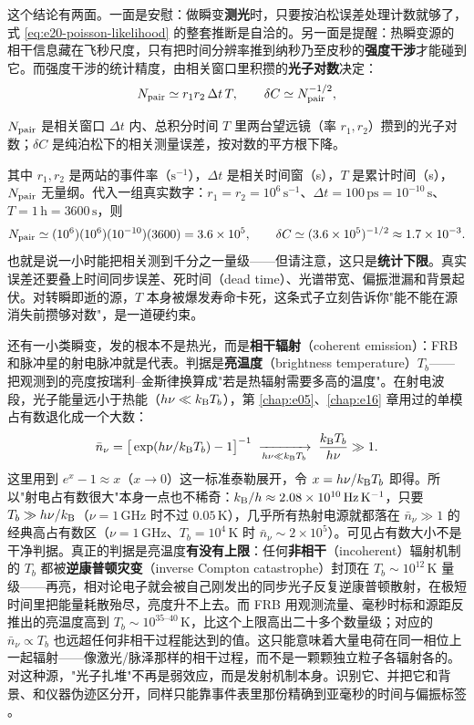 这个结论有两面。一面是安慰：做瞬变\textbf{测光}时，只要按泊松误差处理计数就够了，式 \eqref{eq:e20-poisson-likelihood} 的整套推断是自洽的。另一面是提醒：热瞬变源的相干信息藏在飞秒尺度，只有把时间分辨率推到纳秒乃至皮秒的\textbf{强度干涉}才能碰到它。而强度干涉的统计精度，由相关窗口里积攒的\textbf{光子对数}决定：
\begin{equation}
  N_{\rm pair}\simeq r_1 r_2\,\Delta t\,T,
  \qquad
  \delta C\simeq N_{\rm pair}^{-1/2},
  \label{eq:e20-pair-statistics}
\end{equation}
\begin{formulaexplain}
\(N_{\rm pair}\) 是相关窗口 \(\Delta t\) 内、总积分时间 \(T\) 里两台望远镜（率 \(r_1,r_2\)）攒到的光子对数；\(\delta C\) 是纯泊松下的相关测量误差，按对数的平方根下降。
\end{formulaexplain}
其中 \(r_1,r_2\) 是两站的事件率（\(\mathrm{s^{-1}}\)），\(\Delta t\) 是相关时间窗（s），\(T\) 是累计时间（s），\(N_{\rm pair}\) 无量纲。代入一组真实数字：\(r_1=r_2=10^6\,\mathrm{s^{-1}}\)、\(\Delta t=100\,\mathrm{ps}=10^{-10}\,\mathrm{s}\)、\(T=1\,\mathrm{h}=3600\,\mathrm{s}\)，则
\[
  N_{\rm pair}\simeq (10^6)(10^6)(10^{-10})(3600)=3.6\times10^{5},
  \qquad
  \delta C\simeq (3.6\times10^5)^{-1/2}\approx1.7\times10^{-3}.
\]
也就是说一小时能把相关测到千分之一量级——但请注意，这只是\textbf{统计下限}。真实误差还要叠上时间同步误差、死时间（dead time）、光谱带宽、偏振泄漏和背景起伏。对转瞬即逝的源，\(T\) 本身被爆发寿命卡死，这条式子立刻告诉你"能不能在源消失前攒够对数"，是一道硬约束。

还有一小类瞬变，发的根本不是热光，而是\textbf{相干辐射}（coherent emission）：FRB 和脉冲星的射电脉冲就是代表。判据是\textbf{亮温度}（brightness temperature）\(T_b\)——把观测到的亮度按瑞利--金斯律换算成"若是热辐射需要多高的温度"。在射电波段，光子能量远小于热能（\(h\nu\ll k_{\rm B}T_b\)），第 \ref{chap:e05}、\ref{chap:e16} 章用过的单模占有数退化成一个大数：
\[
  \bar n_\nu=\big[\exp(h\nu/k_{\rm B}T_b)-1\big]^{-1}
  \;\xrightarrow[h\nu\ll k_{\rm B}T_b]{}\;
  \frac{k_{\rm B}T_b}{h\nu}\gg1 .
\]
这里用到 \(e^x-1\approx x\)（\(x\to0\)）这一标准泰勒展开，令 \(x=h\nu/k_{\rm B}T_b\) 即得。所以"射电占有数很大"本身一点也不稀奇：\(k_{\rm B}/h\approx2.08\times10^{10}\,\mathrm{Hz\,K^{-1}}\)，只要 \(T_b\gg h\nu/k_{\rm B}\)（\(\nu=1\,\mathrm{GHz}\) 时不过 \(0.05\,\mathrm{K}\)），几乎所有热射电源就都落在 \(\bar n_\nu\gg1\) 的经典高占有数区（\(\nu=1\,\mathrm{GHz}\)、\(T_b=10^4\,\mathrm{K}\) 时 \(\bar n_\nu\sim2\times10^5\)）。可见占有数大小不是干净判据。真正的判据是亮温度\textbf{有没有上限}：任何\textbf{非相干}（incoherent）辐射机制的 \(T_b\) 都被\textbf{逆康普顿灾变}（inverse Compton catastrophe）封顶在 \(T_b\sim10^{12}\,\mathrm{K}\) 量级——再亮，相对论电子就会被自己刚发出的同步光子反复逆康普顿散射，在极短时间里把能量耗散殆尽，亮度升不上去。而 FRB 用观测流量、毫秒时标和源距反推出的亮温度高到 \(T_b\sim10^{35\text{--}40}\,\mathrm{K}\)，比这个上限高出二十多个数量级；对应的 \(\bar n_\nu\propto T_b\) 也远超任何非相干过程能达到的值。这只能意味着大量电荷在同一相位上一起辐射——像激光/脉泽那样的相干过程，而不是一颗颗独立粒子各辐射各的。对这种源，"光子扎堆"不再是弱效应，而是发射机制本身。识别它、并把它和背景、和仪器伪迹区分开，同样只能靠事件表里那份精确到亚毫秒的时间与偏振标签 \citep{2020Natur.587...59B,2020Natur.587...54C,2020Natur.581..391M}。

